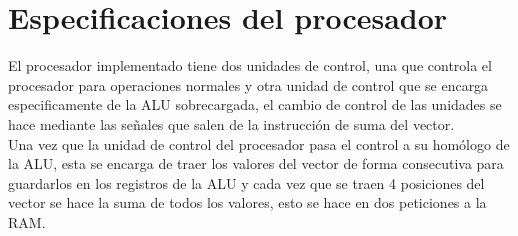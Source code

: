 \section{Especificaciones del procesador}
El procesador implementado tiene dos unidades de control, una que controla el procesador para operaciones normales y
otra unidad de control que se encarga especificamente de la ALU sobrecargada, el cambio de control de las unidades
se hace mediante las señales que salen de la instrucción de suma del vector.\\
Una vez que la unidad de control del procesador pasa el control a su homólogo de la ALU, esta se encarga de traer los
valores del vector de forma consecutiva para guardarlos en los registros de la ALU y cada vez que se traen 4 posiciones
del vector se hace la suma de todos los valores, esto se hace en dos peticiones a la RAM.\\
